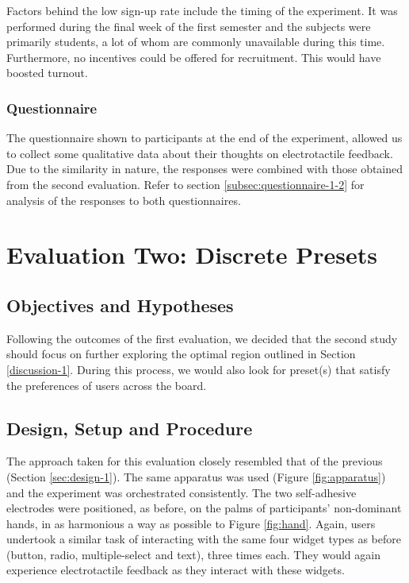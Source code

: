 \documentclass{mpaper}
\begin{document}
Factors behind the low sign-up rate include the timing of the experiment. It was performed during the final week of the first semester and the subjects were primarily students, a lot of whom are commonly unavailable during this time. Furthermore, no incentives could be offered for recruitment. This would have boosted turnout.

\subsubsection{Questionnaire}\label{subsubsec:questionnaire-1}
The questionnaire shown to participants at the end of the experiment, allowed us to collect some qualitative data about their thoughts on electrotactile feedback. Due to the similarity in nature, the responses were combined with those obtained from the second evaluation. Refer to section \ref{subsec:questionnaire-1-2} for analysis of the responses to both questionnaires.

\section{Evaluation Two: Discrete Presets} \label{eval2}
\subsection{Objectives and Hypotheses}
Following the outcomes of the first evaluation, we decided that the second study should focus on further exploring the optimal region outlined in Section \ref{discussion-1}. During this process, we would also look for preset(s) that satisfy the preferences of users across the board.

\subsection{Design, Setup and Procedure} \label{sec:design-2}
The approach taken for this evaluation closely resembled that of the previous (Section \ref{sec:design-1}). The same apparatus was used (Figure \ref{fig:apparatus}) and the experiment was orchestrated consistently. The two self-adhesive electrodes were positioned, as before, on the palms of participants' non-dominant hands, in as harmonious a way as possible to Figure \ref{fig:hand}. Again, users undertook a similar task of interacting with the same four widget types as before (button, radio, multiple-select and text), three times each. They would again experience electrotactile feedback as they interact with these widgets.
\end{document}
